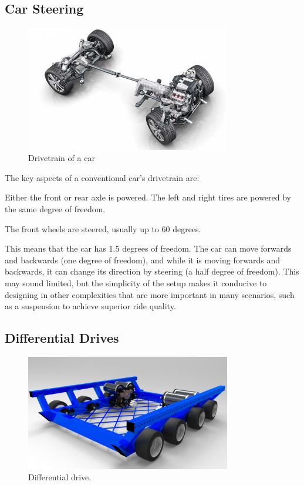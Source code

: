 \subsection{Car Steering}
\begin{figure}[H]
	\includegraphics[width=0.8\textwidth]{imgs/drivetrain_car.jpeg}
	\caption{Drivetrain of a car}
\end{figure}

The key aspects of a conventional car's drivetrain are:
\begin{asparaenum}
	\item Either the front or rear axle is powered. The left and right tires are powered by the same degree of freedom.
	\item The front wheels are steered, usually up to 60 degrees.
\end{asparaenum}

This means that the car has 1.5 degrees of freedom. The car can move forwards and backwards (one degree of freedom), and while it is moving forwards and backwards, it can change its direction by steering (a half degree of freedom). This may sound limited, but the simplicity of the setup makes it conducive to designing in other complexities that are more important in many scenarios, such as a suspension to achieve superior ride quality.

\subsection{Differential Drives}
\begin{figure}[H]
	\includegraphics[width=0.8\textwidth]{imgs/drivetrain_differential.jpeg}
	\caption{Differential drive.}
\end{figure}

